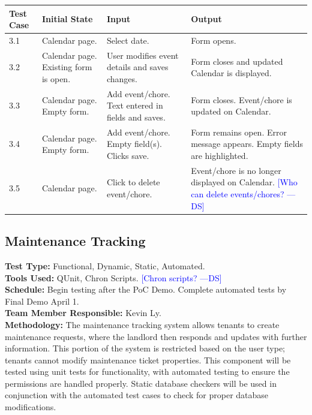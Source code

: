 \documentclass[12pt]{article}
\newcommand{\authornote}[3]{\textcolor{#1}{[#3 ---#2]}}
\newcommand{\authornote}[3]{}
\newcommand{\ds}[1]{\authornote{blue}{DS}{#1}}
\begin{document}
\begin{longtable}{|p{2cm}|p{3cm}|p{5cm}|p{5cm}|}
\hline
\textbf{Test Case}  & \textbf{Initial State} & \textbf{Input} & \textbf{Output} \\ \hline
3.1 & Calendar page. & Select date. & Form opens. \\ 
\hline
3.2 & Calendar page. Existing form is open. & User modifies event details and saves changes. & Form closes and updated Calendar is displayed. \\ 
\hline
3.3 & Calendar page. Empty form. & Add event/chore. Text entered in fields and saves. & Form closes. Event/chore is updated on Calendar. \\ 
\hline
3.4 & Calendar page. Empty form. & Add event/chore. Empty field(s). Clicks save. & Form remains open. Error message appears. Empty fields are highlighted. \\
\hline
3.5 & Calendar page. & Click to delete event/chore. & Event/chore is no longer displayed on Calendar. \ds{Who can delete events/chores?} \\
\hline
\end{longtable}

\subsection{Maintenance Tracking}
\textbf{Test Type:} Functional, Dynamic, Static, Automated. \\
\textbf{Tools Used:} QUnit, Chron Scripts. \ds{Chron scripts?}\\
\textbf{Schedule:} Begin testing after the PoC Demo. Complete automated tests by Final Demo April 1. \\
\textbf{Team Member Responsible:} Kevin Ly. \\
\textbf{Methodology:} The maintenance tracking system allows tenants to create maintenance requests, where the landlord then responds and updates with further information. This portion of the system is restricted based on the user type; tenants cannot modify maintenance ticket properties. This component will be tested using unit tests for functionality, with automated testing to ensure the permissions are handled properly. Static database checkers will be used in conjunction with the automated test cases to check for proper database modifications.
\end{document}
